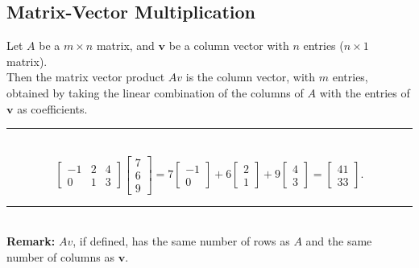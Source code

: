 \documentclass[a4paper, 9pt]{extarticle}
\begin{document}
\subsection*{Matrix-Vector Multiplication}
\begin{definitionbox}{}{}
  Let $A$ be a $m \times n$ matrix, and $\textbf{v}$ be a column vector with $n$ entries ($n \times 1$ matrix). \\[2ex]
  Then the matrix vector product $Av$ is the column vector, with $m$ entries, obtained by taking the linear combination of the columns of $A$ with the entries of $\textbf{v}$ as coefficients.
  \\ \rule{\textwidth}{1px} \\
  $$
    \begin{bmatrix}
      -1 & 2 & 4 \\
      0  & 1 & 3
    \end{bmatrix}
    \begin{bmatrix}
      7 \\
      6 \\
      9
    \end{bmatrix}
    =
    7 \begin{bmatrix}
      -1 \\
      0
    \end{bmatrix}
    + 6 \begin{bmatrix}
      2 \\
      1
    \end{bmatrix}
    + 9 \begin{bmatrix}
      4 \\
      3
    \end{bmatrix}
    =
    \begin{bmatrix}
      41 \\
      33
    \end{bmatrix}.
  $$
  \rule{\textwidth}{1px} \\[2ex]
  \textbf{Remark:} $Av$, if defined, has the same number of rows as $A$ and the same number of columns as $\textbf{v}$.
\end{definitionbox}
\end{document}
